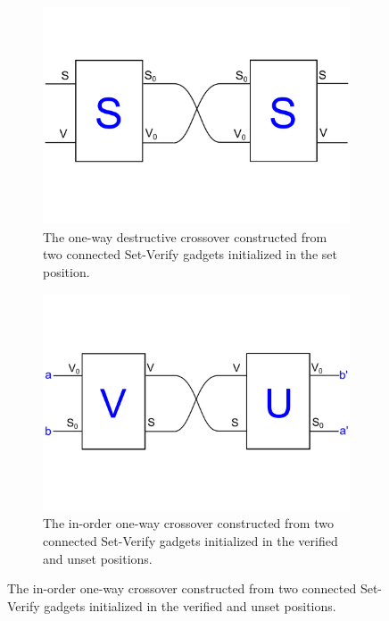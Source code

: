\documentclass[11pt]{article}
\begin{document}
\begin{figure}[!ht]
  \centering
  \caption{Two types of crossover gadgets}
  \begin{subfigure}[b]{0.45\textwidth}
    \includegraphics[width=\textwidth]{DestructiveCrossover}
    \caption{The one-way destructive crossover constructed from two connected Set-Verify gadgets initialized in the set position.}
    \label{DestructiveCrossover}
  \end{subfigure}
  \hfill
  \begin{subfigure}[b]{0.45\textwidth}
    \includegraphics[width=\textwidth]{InOrderCrossover}
    \caption{The in-order one-way crossover constructed from two connected Set-Verify gadgets initialized in the verified and unset positions.}
    \label{InOrderCrossover}
  \end{subfigure}
\end{figure}
\end{document}
